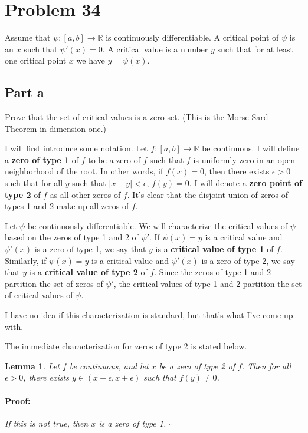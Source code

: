 \documentclass{article}
\newenvironment{proof}{\paragraph{Proof:}}{\hfill$\square$}
\newtheorem{lemma}[theorem]{Lemma}
\newcommand{\R}{\mathbb{R}}
\begin{document}
\section*{Problem 34}

Assume that $\psi: [a, b] \rightarrow \R$ is continuously differentiable. A critical point of $\psi$ is an $x$ such that $\psi'(x) = 0$. A critical value is a number $y$ such that for at least one critical point $x$ we have $y = \psi(x)$.

\subsection*{Part a}

Prove that the set of critical values is a zero set. (This is the Morse-Sard Theorem in dimension one.)

I will first introduce some notation. Let $f: [a, b] \rightarrow \R$ be continuous. I will define a \textbf{zero of type 1} of $f$ to be a zero of $f$ such that $f$ is uniformly zero in an open neighborhood of the root. In other words, if $f(x) = 0$, then there exists $\epsilon > 0$ such that for all $y$ such that $|x-y| < \epsilon$, $f(y) = 0$. I will denote a \textbf{zero point of type 2} of $f$ as all other zeros of $f$. It's clear that the disjoint union of zeros of types 1 and 2 make up all zeros of $f$.

Let $\psi$ be continuously differentiable. We will characterize the critical values of $\psi$ based on the zeros of type 1 and 2 of $\psi'$. If $\psi(x) = y$ is a critical value and $\psi'(x)$ is a zero of type 1, we say that $y$ is a \textbf{critical value of type 1} of $f$. Similarly, if $\psi(x) = y$ is a critical value and $\psi'(x)$ is a zero of type 2, we say that $y$ is a \textbf{critical value of type 2} of $f$. Since the zeros of type 1 and 2 partition the set of zeros of $\psi'$, the critical values of type 1 and 2 partition the set of critical values of $\psi$.

I have no idea if this characterization is standard, but that's what I've come up with.

The immediate characterization for zeros of type 2 is stated below.

\begin{lemma}
\label{ZeroType2ImpliesNonzeroPoint}
Let $f$ be continuous, and let $x$ be a zero of type 2 of $f$. Then for all $\epsilon > 0$, there exists $y \in (x-\epsilon, x + \epsilon)$ such that $f(y) \neq 0$.
\begin{proof}
If this is not true, then $x$ is a zero of type 1.
\end{proof} 
\end{lemma}
\end{document}
